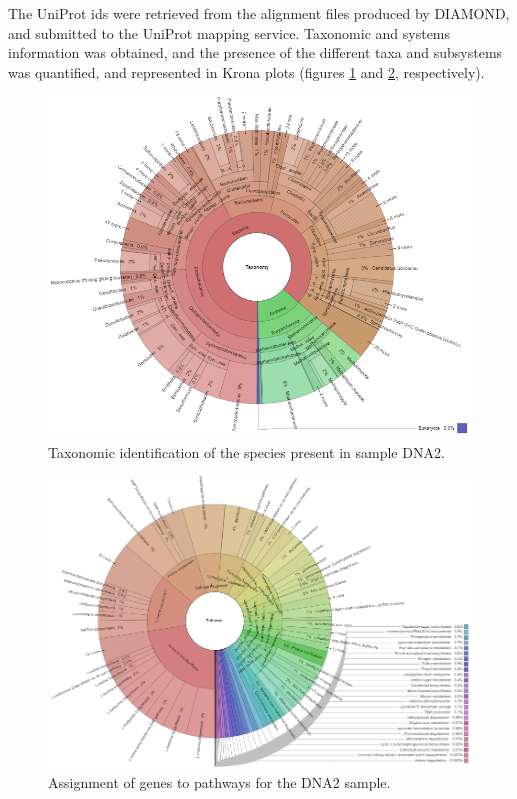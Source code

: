 \documentclass[
  oneside,
  11pt, a4paper,
  footinclude=true,
  headinclude=true,
  cleardoublepage=empty
]{scrbook}
\begin{document}
    The UniProt ids were retrieved from the alignment files produced by DIAMOND, and submitted to the UniProt mapping service. Taxonomic and systems information was obtained, and the presence of the different taxa and subsystems was quantified, and represented in Krona plots (figures \ref{fig:krona_dna2tax} and \ref{fig:krona_dna2sys}, respectively).
    
    \begin{figure}[ph!]    
    \includegraphics[width=\columnwidth]{FiguresUndTables/Results/Annotating/krona_dna2tax.png}
    \caption{Taxonomic identification of the species present in sample DNA2.}
    \label{fig:krona_dna2tax}
    \end{figure}
    
    \begin{figure}[ph!]    
    \includegraphics[width=\columnwidth]{FiguresUndTables/Results/Annotating/krona_dna2sys.png}
    \caption{Assignment of genes to pathways for the DNA2 sample.}
    \label{fig:krona_dna2sys}
    \end{figure}
    
\end{document}
